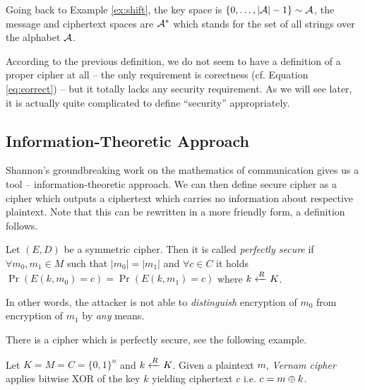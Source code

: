 \begin{note}
	Going back to Example \ref{ex:shift}, the key space is $\{0 , \ldots , |{\cal A}|-1\}\sim\cal A$, the message and ciphertext spaces are ${\cal A}^*$ which stands for the set of all strings over the alphabet $\cal A$.
\end{note}

According to the previous definition, we do not seem to have a definition of a proper cipher at all -- the only requirement is corectness (cf. Equation \ref{eq:correct}) -- but it totally lacks any security requirement. As we will see later, it is actually quite complicated to define ``security'' appropriately.


\subsection{Information-Theoretic Approach}

Shannon's groundbreaking work \cite{shannon1949mathematical} on the mathematics of communication gives us a tool -- information-theoretic approach. We can then define secure cipher as a cipher which outputs a ciphertext which carries no information about respective plaintext. Note that this can be rewritten in a more friendly form, a definition follows.

\begin{defn}
\label{def:perfsec}
	Let $(E,D)$ be a symmetric cipher. Then it is called {\em perfectly secure} if $\forall m_0,m_1\in M$ such that $|m_0| = |m_1|$ and $\forall c\in C$ it holds $\Pr\left(E(k,m_0)=c\right) = \Pr\left(E(k,m_1)=c\right)$ where $k\xleftarrow{R} K$.
\end{defn}

\begin{note}
\label{note:indist}
	In other words, the attacker is not able to {\em distinguish} encryption of $m_0$ from encryption of $m_1$ by {\em any} means.
\end{note}

There is a cipher which is perfectly secure, see the following example.

\begin{example}
	Let $K = M = C = \{0,1\}^n$ and $k\xleftarrow{R} K$. Given a plaintext $m$, {\em Vernam cipher} applies bitwise XOR of the key $k$ yielding ciphertext $c$ i.e. $c = m\oplus k$.
\end{example}

